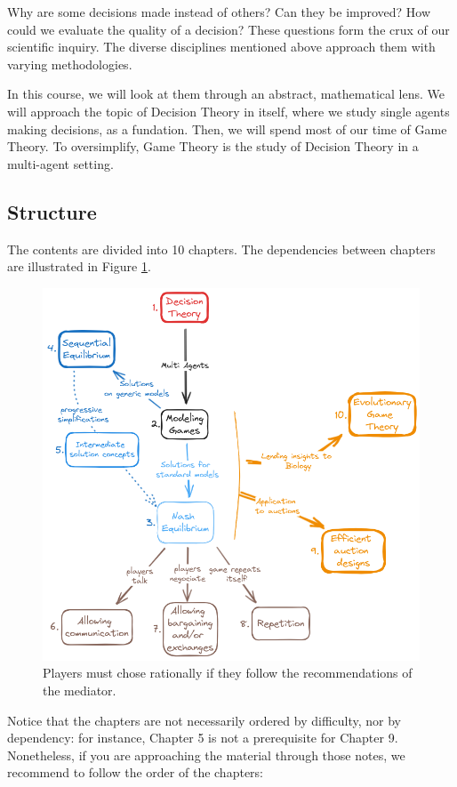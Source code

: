 Why are some decisions made instead of others? Can they be improved? How could we evaluate the quality of a decision?
These questions form the crux of our scientific inquiry.
The diverse disciplines mentioned above approach them with varying methodologies.

In this course, we will look at them through an abstract, mathematical lens.
We will approach the topic of Decision Theory in itself, where we study single agents making decisions, as a fundation.
Then, we will spend most of our time of Game Theory. To oversimplify, Game Theory is the study of Decision Theory in a multi-agent setting.

\subsection*{Structure}

The contents are divided into 10 chapters. 
The dependencies between chapters are illustrated in Figure \ref{course-map}.

\begin{figure}[!ht]
\centering
\includegraphics[scale=0.5]{map.png}
\caption{Players must chose rationally if they follow the recommendations of the mediator.}
\label{course-map}
\end{figure}


Notice that the chapters are not necessarily ordered by difficulty, nor by dependency: for instance, Chapter 5 is not a prerequisite for Chapter 9.
Nonetheless, if you are approaching the material through those notes, we recommend to follow the order of the chapters:

